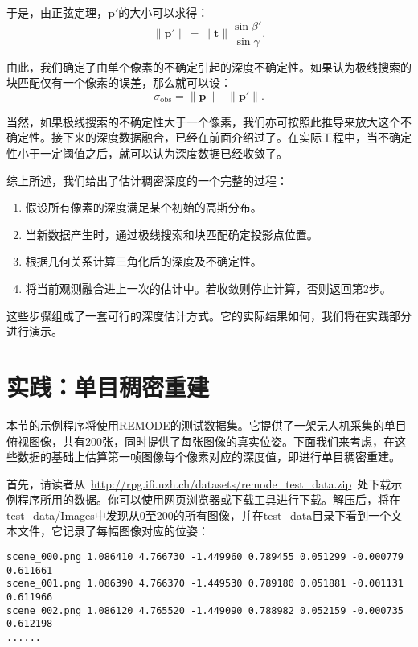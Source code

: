于是，由正弦定理，$\bm{p}'$的大小可以求得：
\begin{equation}
\| \bm{p}' \| = \| \bm{t} \| \frac{{\sin \beta '}}{{\sin \gamma }}.
\end{equation}

由此，我们确定了由单个像素的不确定引起的深度不确定性。如果认为极线搜索的块匹配仅有一个像素的误差，那么就可以设：
\begin{equation}
\sigma_{\mathrm{obs}} = \| \bm{p} \|-\| \bm{p}' \|.
\end{equation}

当然，如果极线搜索的不确定性大于一个像素，我们亦可按照此推导来放大这个不确定性。接下来的深度数据融合，已经在前面介绍过了。在实际工程中，当不确定性小于一定阈值之后，就可以认为深度数据已经收敛了。

综上所述，我们给出了估计稠密深度的一个完整的过程：
\begin{mdframed}
\begin{enumerate}
	\item 假设所有像素的深度满足某个初始的高斯分布。
	\item 当新数据产生时，通过极线搜索和块匹配确定投影点位置。
	\item 根据几何关系计算三角化后的深度及不确定性。
	\item 将当前观测融合进上一次的估计中。若收敛则停止计算，否则返回第2步。
\end{enumerate}
\end{mdframed}

这些步骤组成了一套可行的深度估计方式。它的实际结果如何，我们将在实践部分进行演示。

\section{实践：单目稠密重建}
本节的示例程序将使用REMODE\textsuperscript{\cite{Handa2012, Pizzoli2014}}的测试数据集。它提供了一架无人机采集的单目俯视图像，共有200张，同时提供了每张图像的真实位姿。下面我们来考虑，在这些数据的基础上估算第一帧图像每个像素对应的深度值，即进行单目稠密重建。

首先，请读者从~\url{http://rpg.ifi.uzh.ch/datasets/remode_test_data.zip}~处下载示例程序所用的数据。你可以使用网页浏览器或下载工具进行下载。解压后，将在test\_data/Images中发现从0至200的所有图像，并在test\_data目录下看到一个文本文件，它记录了每幅图像对应的位姿：
\begin{lstlisting}
scene_000.png 1.086410 4.766730 -1.449960 0.789455 0.051299 -0.000779 0.611661
scene_001.png 1.086390 4.766370 -1.449530 0.789180 0.051881 -0.001131 0.611966
scene_002.png 1.086120 4.765520 -1.449090 0.788982 0.052159 -0.000735 0.612198
......
\end{lstlisting}

